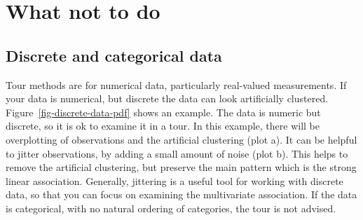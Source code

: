 \documentclass[
  letterpaper,
]{krantz}
\begin{document}
\section{What not to do}\label{what-not-to-do}

\subsection{Discrete and categorical
data}\label{discrete-and-categorical-data}

Tour methods are for numerical data, particularly real-valued
measurements. If your data is numerical, but discrete the data can look
artificially clustered. Figure~\ref{fig-discrete-data-pdf} shows an
example. The data is numeric but discrete, so it is ok to examine it in
a tour. In this example, there will be overplotting of observations and
the artificial clustering (plot a). It can be helpful to jitter
observations, by adding a small amount of noise (plot b). This helps to
remove the artificial clustering, but preserve the main pattern which is
the strong linear association. Generally, jittering is a useful tool for
working with discrete data, so that you can focus on examining the
multivariate association. If the data is categorical, with no natural
ordering of categories, the tour is not advised.
\end{document}
